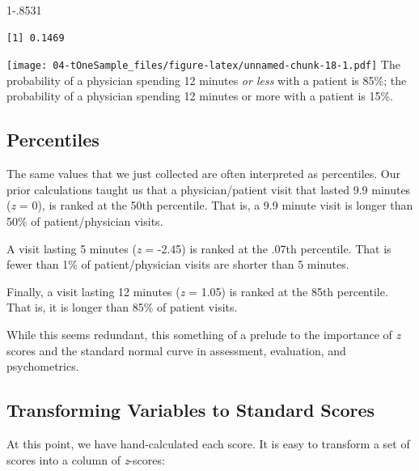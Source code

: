 \documentclass[
  11pt,
]{book}
\newenvironment{Shaded}{\begin{snugshade}}{\end{snugshade}}
\newcommand{\DecValTok}[1]{\textcolor[rgb]{0.06,0.06,0.06}{#1}}
\newcommand{\FloatTok}[1]{\textcolor[rgb]{0.06,0.06,0.06}{#1}}
\newcommand{\FunctionTok}[1]{\textcolor[rgb]{0.27,0.27,0.27}{\textbf{#1}}}
\newcommand{\NormalTok}[1]{#1}
\newcommand{\OtherTok}[1]{\textcolor[rgb]{0.37,0.37,0.37}{#1}}
\newcommand{\SpecialCharTok}[1]{\textcolor[rgb]{0.43,0.43,0.43}{\textbf{#1}}}
\begin{document}
\begin{Shaded}
\begin{Highlighting}[]
\DecValTok{1}\FloatTok{{-}.8531}
\end{Highlighting}
\end{Shaded}

\begin{verbatim}
[1] 0.1469
\end{verbatim}

\texttt{[image: 04-tOneSample\_files/figure-latex/unnamed-chunk-18-1.pdf]} The probability of a physician spending 12 minutes \emph{or less} with a patient is 85\%; the probability of a physician spending 12 minutes or more with a patient is 15\%.

\hypertarget{percentiles}{%
\subsection{Percentiles}\label{percentiles}}

The same values that we just collected are often interpreted as percentiles. Our prior calculations taught us that a physician/patient visit that lasted 9.9 minutes (\emph{z} = 0), is ranked at the 50th percentile. That is, a 9.9 minute visit is longer than 50\% of patient/physician visits.

A visit lasting 5 minutes (\emph{z} = -2.45) is ranked at the .07th percentile. That is fewer than 1\% of patient/physician visits are shorter than 5 minutes.

Finally, a visit lasting 12 minutes (\emph{z} = 1.05) is ranked at the 85th percentile. That is, it is longer than 85\% of patient visits.

While this seems redundant, this something of a prelude to the importance of \emph{z} scores and the standard normal curve in assessment, evaluation, and psychometrics.

\hypertarget{transforming-variables-to-standard-scores}{%
\subsection{Transforming Variables to Standard Scores}\label{transforming-variables-to-standard-scores}}

At this point, we have hand-calculated each score. It is easy to transform a set of scores into a column of \emph{z}-scores:

\begin{Shaded}
\end{Shaded}
\end{document}

